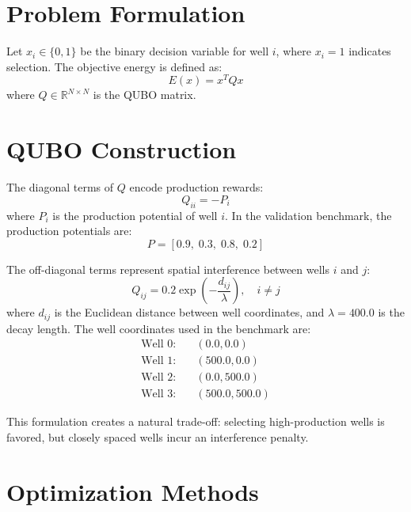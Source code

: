 \documentclass[12pt]{article}
\begin{document}
\section{Problem Formulation}

Let \(x_{i} \in \{0,1\}\) be the binary decision variable for well \(i\), where \(x_{i} = 1\) indicates selection. The objective energy is defined as:
\begin{equation}
E(x) = x^{T}Qx 
\label{eq:qubo_energy}
\end{equation}
where \(Q \in \mathbb{R}^{N \times N}\) is the QUBO matrix.

\section{QUBO Construction}

The diagonal terms of \(Q\) encode production rewards:
\begin{equation}
Q_{ii} = -P_{i} 
\label{eq:diagonal}
\end{equation}
where \(P_{i}\) is the production potential of well \(i\). In the validation benchmark, the production potentials are:
\begin{equation}
P = [0.9, \; 0.3, \; 0.8, \; 0.2]
\label{eq:production_values}
\end{equation}

The off-diagonal terms represent spatial interference between wells \(i\) and \(j\):
\begin{equation}
Q_{ij} = 0.2 \exp\left(-\frac{d_{ij}}{\lambda}\right), \quad i \neq j
\label{eq:interference}
\end{equation}
where \(d_{ij}\) is the Euclidean distance between well coordinates, and \(\lambda = 400.0\) is the decay length. The well coordinates used in the benchmark are:
\begin{align*}
\text{Well 0:} & \quad (0.0, 0.0) \\
\text{Well 1:} & \quad (500.0, 0.0) \\
\text{Well 2:} & \quad (0.0, 500.0) \\
\text{Well 3:} & \quad (500.0, 500.0)
\end{align*}

This formulation creates a natural trade-off: selecting high-production wells is favored, but closely spaced wells incur an interference penalty.

\section{Optimization Methods}
\end{document}

